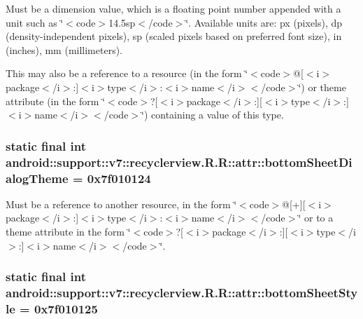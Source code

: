 Must be a dimension value, which is a floating point number appended with a unit such as \char`\"{}$<$code$>$14.5sp$<$/code$>$\char`\"{}. Available units are: px (pixels), dp (density-independent pixels), sp (scaled pixels based on preferred font size), in (inches), mm (millimeters). 

This may also be a reference to a resource (in the form \char`\"{}$<$code$>$@\mbox{[}$<$i$>$package$<$/i$>$:\mbox{]}$<$i$>$type$<$/i$>$:$<$i$>$name$<$/i$>$$<$/code$>$\char`\"{}) or theme attribute (in the form \char`\"{}$<$code$>$?\mbox{[}$<$i$>$package$<$/i$>$:\mbox{]}\mbox{[}$<$i$>$type$<$/i$>$:\mbox{]}$<$i$>$name$<$/i$>$$<$/code$>$\char`\"{}) containing a value of this type. \hypertarget{classandroid_1_1support_1_1v7_1_1recyclerview_1_1_r_1_1attr_117c7dd2f5aac550d06c55f9e7c89ac1}{
\subsubsection[{bottomSheetDialogTheme}]{\setlength{\rightskip}{0pt plus 5cm}static final int android::support::v7::recyclerview.R.R::attr::bottomSheetDialogTheme = 0x7f010124}}
\label{classandroid_1_1support_1_1v7_1_1recyclerview_1_1_r_1_1attr_117c7dd2f5aac550d06c55f9e7c89ac1}


Must be a reference to another resource, in the form \char`\"{}$<$code$>$@\mbox{[}+\mbox{]}\mbox{[}$<$i$>$package$<$/i$>$:\mbox{]}$<$i$>$type$<$/i$>$:$<$i$>$name$<$/i$>$$<$/code$>$\char`\"{} or to a theme attribute in the form \char`\"{}$<$code$>$?\mbox{[}$<$i$>$package$<$/i$>$:\mbox{]}\mbox{[}$<$i$>$type$<$/i$>$:\mbox{]}$<$i$>$name$<$/i$>$$<$/code$>$\char`\"{}. \hypertarget{classandroid_1_1support_1_1v7_1_1recyclerview_1_1_r_1_1attr_dc801284dfaa426b8e30facccaf6262a}{
\subsubsection[{bottomSheetStyle}]{\setlength{\rightskip}{0pt plus 5cm}static final int android::support::v7::recyclerview.R.R::attr::bottomSheetStyle = 0x7f010125}}
\label{classandroid_1_1support_1_1v7_1_1recyclerview_1_1_r_1_1attr_dc801284dfaa426b8e30facccaf6262a}


